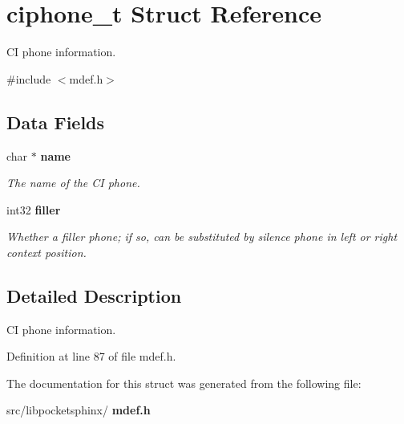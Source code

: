 \section{ciphone\+\_\+t Struct Reference}
\label{structciphone__t}


CI phone information.  




{\ttfamily \#include $<$mdef.\+h$>$}

\subsection*{Data Fields}
\begin{DoxyCompactItemize}
\item 
\mbox{\label{structciphone__t_a2327c5f09fa245c25926c718fdab642d}} 
char $\ast$ \textbf{ name}
\begin{DoxyCompactList}\small\item\em The name of the CI phone. \end{DoxyCompactList}\item 
\mbox{\label{structciphone__t_a96e20b175c00c4edcd75d922dba067cd}} 
int32 \textbf{ filler}
\begin{DoxyCompactList}\small\item\em Whether a filler phone; if so, can be substituted by silence phone in left or right context position. \end{DoxyCompactList}\end{DoxyCompactItemize}


\subsection{Detailed Description}
CI phone information. 

Definition at line 87 of file mdef.\+h.



The documentation for this struct was generated from the following file\+:\begin{DoxyCompactItemize}
\item 
src/libpocketsphinx/\textbf{ mdef.\+h}\end{DoxyCompactItemize}
